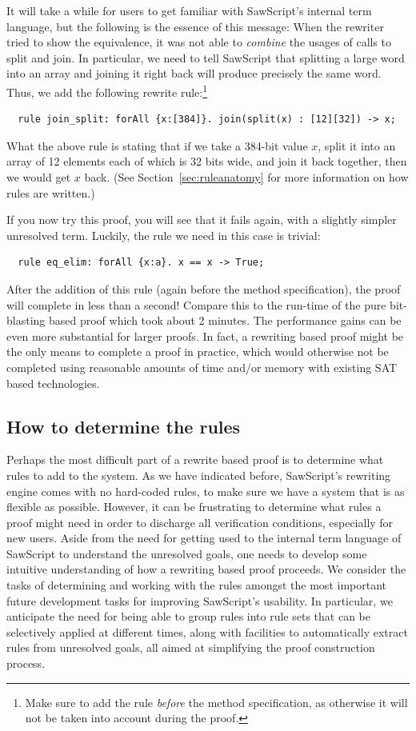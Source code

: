 \documentclass[12pt]{galois-whitepaper}
\newcommand{\sawScript}{{\sc SawScript}\xspace}
\begin{document}
It will take a while for users to get familiar with \sawScript's internal term language, but the following is the essence of this message: When
the rewriter tried to show the equivalence, it was not able to {\em combine} the usages of calls to split and join.
In particular, we need to tell \sawScript that
splitting a large word into an array and joining it right back will produce precisely the same word. Thus, we add the following
rewrite rule:\footnote{Make sure to add the rule {\em before} the method specification, as otherwise it will not be taken into account during the proof.}
\begin{Verbatim}
  rule join_split: forAll {x:[384]}. join(split(x) : [12][32]) -> x;
\end{Verbatim}
What the above rule is stating that if we take a 384-bit value $x$, split it into an array of 12 elements each of which is 32 bits wide, and join it back
together, then we would get $x$ back. (See Section~\ref{sec:ruleanatomy} for more information on how rules are written.)

If you now try this proof, you will see that it fails again, with a slightly simpler unresolved term. Luckily, the rule we need in this case is trivial:
\begin{Verbatim}
  rule eq_elim: forAll {x:a}. x == x -> True;
\end{Verbatim}

After the addition of this rule (again before the method specification),
the proof will complete in less than a second! Compare this to the run-time of the pure bit-blasting based proof
which took about 2 minutes. The performance gains can be even more substantial for larger proofs. In fact, a rewriting
based proof might be the only means to complete a proof in practice, which would otherwise not be completed using reasonable amounts of time and/or memory with
existing SAT based technologies.

\subsection{How to determine the rules}
Perhaps the most difficult part of a rewrite based proof is to determine what rules to add to the system. As we have indicated before, \sawScript's rewriting
engine comes with
no hard-coded rules, to make sure we have a system that is as flexible as possible. However, it can be frustrating to determine what
rules a proof might need in order to discharge all verification conditions, especially for new users.
Aside from the need for getting used to the internal term language of \sawScript to understand
the unresolved goals, one needs to develop some intuitive understanding of how a rewriting based proof proceeds. We consider the tasks of determining and working
with the rules amongst the most important future development tasks for improving \sawScript's usability. In particular, we anticipate the need for being able
to group rules into rule sets that can be selectively applied at different times, along with facilities to automatically extract rules from
unresolved goals, all aimed at simplifying the proof construction process.
\end{document}
